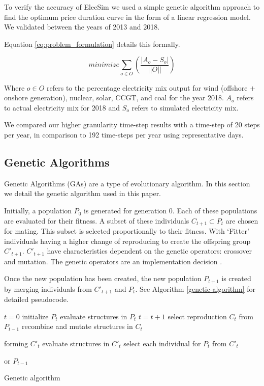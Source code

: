 \documentclass[final,3p,times,twocolumn,numbers]{elsarticle}
\begin{document}
To verify the accuracy of ElecSim we used a simple genetic algorithm approach to find the optimum price duration curve in the form of a linear regression model. We validated between the years of 2013 and 2018.

Equation \ref{eq:problem_formulation} details this formally.

\begin{equation}
	\label{eq:problem_formulation}
	minimize \sum\limits_{o\in O}\left(
	\frac{\left|A_o-S_o\right|}
	{\left|\left|O\right|\right|}
	\right)
\end{equation}

Where $o\in O$ refers to the percentage electricity mix output for wind (offshore $+$ onshore generation), nuclear, solar, CCGT, and coal for the year 2018. $A_o$ refers to actual electricity mix for 2018 and $S_o$ refers to simulated electricity mix.

We compared our higher granularity time-step results with a time-step of 20 steps per year, in comparison to 192 time-steps per year using representative days.

\subsection{Genetic Algorithms}

Genetic Algorithms (GAs) are a type of evolutionary algorithm. In this section we detail the genetic algorithm used in this paper.

Initially, a population $P_{0}$ is generated for generation 0. Each of these populations are evaluated for their fitness. A subset of these individuals $C_{t+1} \subset P_{t}$ are chosen for mating. This subset is selected proportionally to their fitness. With `Fitter' individuals having a higher change of reproducing to create the offspring group $C'_{t+1}$. $C'_{t+1}$ have characteristics dependent on the genetic operators: crossover and mutation. The genetic operators are an implementation decision \cite{FogelDavidB2009}. 

Once the new population has been created, the new population $P_{t+1}$ is created by merging individuals from $C'_{t+1}$ and $P_{t}$. See Algorithm \ref{genetic-algorithm} for detailed pseudocode.
%
\begin{algorithm}[t]
\begin{algorithmic}[1]
\State $t=0$
\State initialize $P_{t}$
\State evaluate structures in $P_{t}$
\State $t=t+1$
\State select reproduction $C_{t}$ from $P_{t-1}$
\State recombine and mutate structures in $C_{t}$

forming $C'_{t}$
\State evaluate structures in $C'_{t}$
\State select each individual for $P_{t}$ from $C'_{t}$ 

or $P_{t-1}$
\EndWhile
\caption{Genetic algorithm \cite{FogelDavidB2009}}
\label{genetic-algorithm}
\end{algorithmic}
\end{algorithm}
\end{document}
